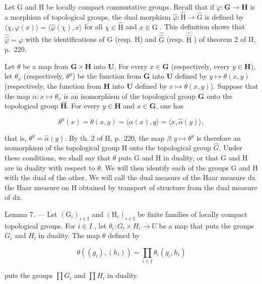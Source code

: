 Let G and H be locally compact commutative groups. Recall that if \(\varphi\colon\mathbf{G}\to\mathbf{H}\) is a morphism of topological groups, the dual morphism \(\widehat{\varphi}\colon\widehat{\mathrm{H}}\to\widehat{\mathrm{G}}\) is defined by \(\langle\chi,\varphi(x)\rangle=\langle\widehat{\varphi}(\chi),x\rangle\) for all \(\chi\in\widehat{\mathrm{H}}\) and \(x\in\mathrm{G}\) . This definition shows that \(\widehat{\widehat{\varphi}}=\varphi\) with the identifications of G (resp. H) and \(\widehat{\widehat{\mathrm{G}}}\) (resp. \(\widehat{\widehat{\mathrm{H}}}\) ) of theorem 2 of II, p.~220.

Let \(\theta\) be a map from \(\mathbf{G} \times \mathbf{H}\) into \(\mathbf{U}\). For every \(x \in \mathbf{G}\) (respectively, every \(y \in \mathbf{H}\)), let \(\theta_x\) (respectively, \(\theta^y\)) be the function from \(\mathbf{G}\) into \(\mathbf{U}\) defined by \(y \mapsto \theta(x, y)\) (respectively, the function from \(\mathbf{H}\) into \(\mathbf{U}\) defined by \(x \mapsto \theta(x, y)\)). Suppose that the map \(\alpha: x \mapsto \theta_x\) is an isomorphism of the topological group \(\mathbf{G}\) onto the topological group \(\widehat{\mathbf{H}}\). For every \(y \in \mathbf{H}\) and \(x \in \mathbf{G}\), one has

\[
\theta^ {y} (x) = \theta (x, y) = \langle \alpha (x), y \rangle = \langle x, \widehat {\alpha} (y) \rangle ,
\]

that is, \(\theta^{y} = \widehat{\alpha}(y)\). By th. 2 of II, p.~220, the map \(\beta: y \mapsto \theta^{y}\) is therefore an isomorphism of the topological group H onto the topological group \(\widehat{G}\). Under these conditions, we shall say that \(\theta\) puts G and H in duality, or that G and H are in duality with respect to \(\theta\). We will then identify each of the groups G and H with the dual of the other. We will call the dual measure of the Haar measure dx the Haar measure on H obtained by transport of structure from the dual measure of dx.

Lemma 7. --- Let \((\mathrm{G}_{i})_{i\in\mathrm{I}}\) and \((\mathrm{H}_{i})_{i\in\mathrm{I}}\) be finite families of locally compact topological groups. For \(i\in I\) , let \(\theta_{i}\colon G_{i}\times H_{i}\to U\) be a map that puts the groups \(G_{i}\) and \(H_{i}\) in duality. The map \(\theta\) defined by

\[
\theta ((g _ {i}), (h _ {i})) = \prod_ {i \in I} \theta_ {i} (g _ {i}, h _ {i})
\]

puts the groups \(\prod G_{i}\) and \(\prod H_{i}\) in duality.

